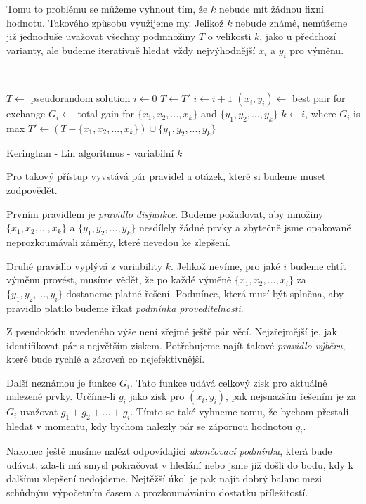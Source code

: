 \documentclass[
  biblatex,
  figures=false,
  glossaries,
  index
]{kidiplom}
\begin{document}
Tomu to problému se můžeme vyhnout tím, že $k$ nebude mít žádnou fixní hodnotu. Takového způsobu využijeme my. Jelikož $k$ nebude známé, nemůžeme již jednoduše uvažovat všechny podmnožiny $T$ o velikosti $k$, jako u předchozí varianty, ale budeme iterativně hledat vždy nejvýhodnější $x_i$ a $y_i$ pro výměnu.
\newline

{\LinesNumbered\SetAlgoNoLine\
\begin{algorithm}[H]
%
$T \leftarrow$ pseudorandom solution\;
{
$i \leftarrow 0$\;
$T \leftarrow T'$\;
{
$i \leftarrow i + 1$\;
$(x_i, y_i) \leftarrow$ best pair for exchange\;
$G_i \leftarrow$ total gain for $\{x_1, x_2, ..., x_k\}$ and $\{y_1, y_2, ..., y_k\}$\;
}
$k \leftarrow i$, where $G_i$ is max \;
$T' \leftarrow (T - \{x_1, x_2, ..., x_k\}) \cup \{y_1, y_2, ..., y_k\}$\;
}
\Return \;
\caption{Keringhan - Lin algoritmus - variabilní $k$}
\end{algorithm}
}\leavevmode\newline


Pro takový přístup vyvstává pár pravidel a otázek, které si budeme muset zodpovědět.

Prvním pravidlem je \textit{pravidlo disjunkce}. Budeme požadovat, aby množiny $\{x_1, x_2, ..., x_k\}$ a $\{y_1, y_2, ..., y_k\}$ nesdílely žádné prvky a zbytečně jsme opakovaně neprozkoumávali záměny, které nevedou ke zlepšení.

Druhé pravidlo vyplývá z variability $k$. Jelikož nevíme, pro jaké $i$ budeme chtít výměnu provést, musíme vědět, že po každé výměně $\{x_1, x_2, ..., x_i\}$ za $\{y_1, y_2, ..., y_i\}$ dostaneme platné řešení. Podmínce, která musí být splněna, aby pravidlo platilo budeme říkat \textit{podmínka proveditelnosti}.

Z pseudokódu uvedeného výše není zřejmé ještě pár věcí. Nejzřejmější je, jak identifikovat pár s největším ziskem. Potřebujeme najít takové \textit{pravidlo výběru}, které bude rychlé a zároveň co nejefektivnější.

Další neznámou je funkce $G_i$. Tato funkce udává celkový zisk pro aktuálně nalezené prvky. Určíme-li $g_i$ jako zisk pro $(x_i, y_i)$, pak nejsnazším řešením je za $G_i$ uvažovat $g_1 + g_2 + ... + g_i$. Tímto se také vyhneme tomu, že bychom přestali hledat v momentu, kdy bychom nalezly pár se zápornou hodnotou $g_i$.

Nakonec ještě musíme nalézt odpovídající \textit{ukončovací podmínku}, která bude udávat, zda-li má smysl pokračovat v hledání nebo jsme již došli do bodu, kdy k dalšímu zlepšení nedojdeme. Nejtěžší úkol je pak najít dobrý balanc mezi schůdným výpočetním časem a prozkoumáváním dostatku příležitostí.
\end{document}
